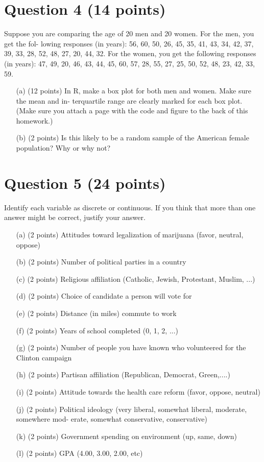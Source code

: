 \documentclass[12pt,letterpaper]{article}
\begin{document}
	\section*{Question 4 (14 points)}
	Suppose you are comparing the age of 20 men and 20 women. For the men, you get the fol- lowing responses (in years): 56, 60, 50, 26, 45, 35, 41, 43, 34, 42, 37, 39, 33, 28, 52, 48, 27, 20, 44, 32. For the women, you get the following responses (in years): 47, 49, 20, 46, 43, 44, 45, 60, 57, 28, 55, 27, 25, 50, 52, 48, 23, 42, 33, 59.
	
	\begin{itemize}
		\item[(a)] (12 points) In R, make a box plot for both men and women. Make sure the mean and in- terquartile range are clearly marked for each box plot. (Make sure you attach a page with the code and figure to the back of this homework.)
		\item[(b)] (2 points) Is this likely to be a random sample of the American female population? Why or why not?
	\end{itemize}
	
	\section*{Question 5 (24 points)}
	Identify each variable as discrete or continuous. If you think that more than one answer might be correct, justify your answer.
	
	\begin{itemize}
		\item[(a)] (2 points) Attitudes toward legalization of marijuana (favor, neutral, oppose)
		\item[(b)] (2 points) Number of political parties in a country
		\item[(c)] (2 points) Religious affiliation (Catholic, Jewish, Protestant, Muslim, ...)
		\item[(d)] (2 points) Choice of candidate a person will vote for
		\item[(e)] (2 points) Distance (in miles) commute to work
		\item[(f)] (2 points) Years of school completed (0, 1, 2, ...)
		\item[(g)] (2 points) Number of people you have known who volunteered for the Clinton campaign
		\item[(h)] (2 points) Partisan affiliation (Republican, Democrat, Green,....)
		\item[(i)] (2 points) Attitude towards the health care reform (favor, oppose, neutral)
		\item[(j)] (2 points) Political ideology (very liberal, somewhat liberal, moderate, somewhere mod- erate, somewhat conservative, conservative)
		\item[(k)] (2 points) Government spending on environment (up, same, down)
		\item[(l)] (2 points) GPA (4.00, 3.00, 2.00, etc)
	\end{itemize}
	
\end{document}
